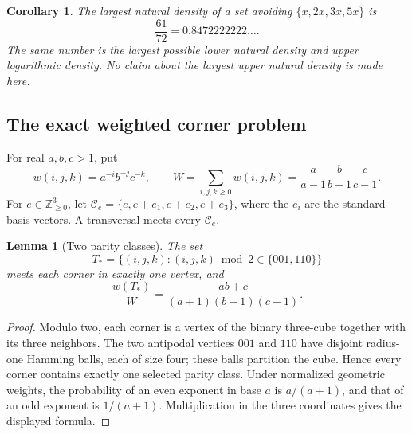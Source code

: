 \documentclass[11pt,a4paper]{article}
\newtheorem{lemma}[theorem]{Lemma}
\newtheorem{corollary}[theorem]{Corollary}
\theoremstyle{remark}\newtheorem{remark}[theorem]{Remark}
\newcommand{\Z}{\mathbb Z}
\newcommand{\C}{\mathcal C}
\numberwithin{equation}{section}
\begin{document}
\begin{corollary}
The largest natural density of a set avoiding $\{x,2x,3x,5x\}$ is
\[
\boxed{\frac{61}{72}=0.8472222222\ldots.}
\]
The same number is the largest possible lower natural density and
upper logarithmic density. No claim about the largest upper natural
density is made here.
\end{corollary}

\subsection{The exact weighted corner problem}
For real $a,b,c>1$, put
\[
w(i,j,k)=a^{-i}b^{-j}c^{-k},\qquad
W=\sum_{i,j,k\ge0}w(i,j,k)
=\frac{a}{a-1}\frac{b}{b-1}\frac{c}{c-1}.
\]
For $e\in\Z_{\ge0}^3$, let
$\C_e=\{e,e+e_1,e+e_2,e+e_3\}$, where the $e_i$ are the standard
basis vectors. A transversal meets every $\C_e$.

\begin{lemma}[Two parity classes]\label{density-lem:code}
The set
\[
 T_* =\{(i,j,k):(i,j,k)\bmod2\in\{001,110\}\}
\]
meets each corner in exactly one vertex, and
\[
 \frac{w(T_*)}{W}
 =\frac{ab+c}{(a+1)(b+1)(c+1)}.
\]
\end{lemma}
\begin{proof}
Modulo two, each corner is a vertex of the binary three-cube together
with its three neighbors. The two antipodal vertices $001$ and $110$
have disjoint radius-one Hamming balls, each of size four; these balls
partition the cube. Hence every corner contains exactly one selected
parity class.
Under normalized geometric weights, the probability of an even
exponent in base $a$ is $a/(a+1)$, and that of an odd exponent is
$1/(a+1)$. Multiplication in the three coordinates gives the displayed
formula.
\end{proof}
\end{document}
